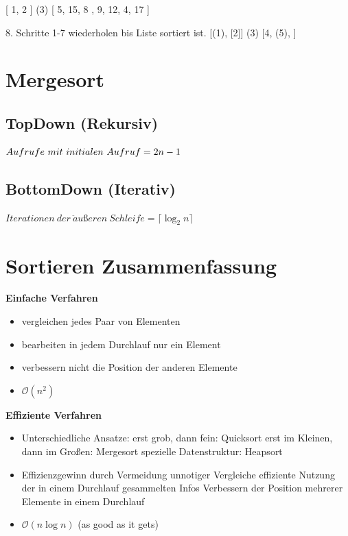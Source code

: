 \documentclass[12pt]{article}
\begin{document}
\begin{center}
	[ 1, 2 ] (3) [ 5, 15, 8 , 9, 12, 4, 17 ]
\end{center}

8. Schritte 1-7 wiederholen bis Liste sortiert ist.
	[(1),  [2]] (3) [4, (5), ]
\newpage

\section{Mergesort}
\subsection{TopDown (Rekursiv)}
\begin{center}
	$Aufrufe \ mit \ initialen \ Aufruf = \Large{2n-1}$
\end{center}

\subsection{BottomDown (Iterativ)}
\begin{center}
	$Iterationen \ der \ \ddot{a}ußeren \ Schleife =  \lceil \log_{2} n \rceil $
\end{center}
\newpage

\section{Sortieren Zusammenfassung}

\textbf{Einfache Verfahren}

\begin{itemize}
	\item vergleichen jedes Paar von Elementen
 	\item bearbeiten in jedem Durchlauf nur ein Element
	 \item verbessern nicht die Position der anderen Elemente
	\item $ \mathcal{O}(n^2) $ 
\end{itemize}
\textbf{Effiziente Verfahren}
\begin{itemize}
	\item Unterschiedliche Ansatze: 
	\subitem erst grob, dann fein: Quicksort
	\subitem erst im Kleinen, dann im Großen: Mergesort
	\subitem spezielle Datenstruktur: Heapsort
	\item Effizienzgewinn durch
	\subitem Vermeidung unnotiger Vergleiche
	\subitem effiziente Nutzung der in einem Durchlauf gesammelten Infos
	\subitem Verbessern der Position mehrerer Elemente in einem Durchlauf
	\item $ \mathcal{O}(n\log n) $  (as good as it gets)
\end{itemize}
\end{document}
